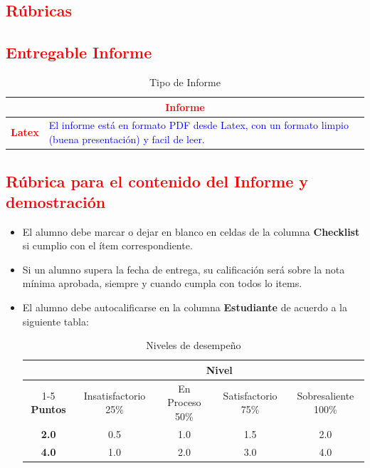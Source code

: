 \documentclass{article}
\begin{document}
\begin{itemize}
	\section{\textcolor{red}{Rúbricas}}
	
	\subsection{\textcolor{red}{Entregable Informe}}
	\begin{table}[H]
		\caption{Tipo de Informe}
		\setlength{\tabcolsep}{0.5em} %
		{\renewcommand{\arraystretch}{1.5}%
		\begin{tabular}{|p{3cm}|p{12cm}|}
			\hline
			\multicolumn{2}{|c|}{\textbf{\textcolor{red}{Informe}}}  \\
			\hline 
			\textbf{\textcolor{red}{Latex}} & \textcolor{blue}{El informe está en formato PDF desde Latex,  con un formato limpio (buena presentación) y facil de leer.}   \\ 
			\hline 
			
			
		\end{tabular}
	}
	\end{table}
	
	\clearpage
	
	\subsection{\textcolor{red}{Rúbrica para el contenido del Informe y demostración}}
	\begin{itemize}			
		\item El alumno debe marcar o dejar en blanco en celdas de la columna \textbf{Checklist} si cumplio con el ítem correspondiente.
		\item Si un alumno supera la fecha de entrega,  su calificación será sobre la nota mínima aprobada, siempre y cuando cumpla con todos lo items.
		\item El alumno debe autocalificarse en la columna \textbf{Estudiante} de acuerdo a la siguiente tabla:
	
		\begin{table}[ht]
			\caption{Niveles de desempeño}
			\begin{center}
			\begin{tabular}{ccccc}
    			\hline
    			 & \multicolumn{4}{c}{Nivel}\\
    			\cline{1-5}
    			\textbf{Puntos} & Insatisfactorio 25\%& En Proceso 50\% & Satisfactorio 75\% & Sobresaliente 100\%\\
    			\textbf{2.0}&0.5&1.0&1.5&2.0\\
    			\textbf{4.0}&1.0&2.0&3.0&4.0\\
    		\hline
			\end{tabular}
		\end{center}
	\end{table}	
	

\end{itemize}
\end{itemize}
\end{document}
